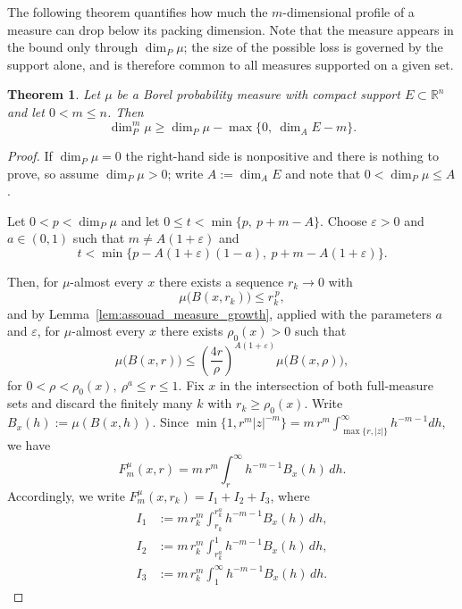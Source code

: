 \documentclass[12pt]{amsart}
\newtheorem{theorem}{Theorem}[section]
\theoremstyle{definition}
\theoremstyle{remark}
\numberwithin{equation}{section}
\begin{document}
The following theorem quantifies how much the $m$-dimensional profile of
a measure can drop below its packing dimension. Note that the
measure appears in the bound only through $\dim_P\mu$; the size of the
possible loss is governed by the support alone, and is therefore common
to all measures supported on a given set.

\begin{theorem}\label{thm:profile_assouad_bound}
    Let $\mu$ be a Borel probability measure with compact support
    $E\subset\mathbb{R}^{n}$ and let $0<m\leq n$. Then
    $$\dim_P^m \mu \geq \dim_P \mu - \max\{0,\ \dim_A E - m\}.$$
\end{theorem}


\begin{proof}
If $\dim_P\mu=0$ the right-hand side is nonpositive and there is nothing
to prove, so assume $\dim_P\mu>0$; write $A:=\dim_A E$ and note that
$0<\dim_P\mu\leq A$.

Let $0<p<\dim_P\mu$ and let $0\leq t<\min\{p,\ p+m-A\}$. Choose
$\varepsilon>0$ and $a\in(0,1)$ such that $m\neq A(1+\varepsilon)$ and
\begin{equation}\label{eq:choice_params}
t<\min\bigl\{p-A(1+\varepsilon)(1-a),\ p+m-A(1+\varepsilon)\bigr\}.
\end{equation}


Then, for $\mu$-almost every $x$ there
exists a sequence $r_k\to 0$ with
\begin{equation}\label{eq:frostman_seq}
\mu\bigl(B(x,r_k)\bigr)\leq r_k^{\,p},
\end{equation}
and by Lemma~\ref{lem:assouad_measure_growth}, applied with the
parameters $a$ and $\varepsilon$, for $\mu$-almost every $x$ there exists
$\rho_0(x)>0$ such that
\begin{equation}\label{eq:growth_thm}
\mu\bigl(B(x,r)\bigr)\leq\left(\frac{4r}{\rho}\right)^{A(1+\varepsilon)}
\mu\bigl(B(x,\rho)\bigr),
\end{equation}
for $0<\rho<\rho_0(x),\
\rho^{a}\leq r\leq 1.$
Fix $x$ in the intersection of both full-measure sets and discard the
finitely many $k$ with $r_k\geq\rho_0(x)$. Write $B_x(h):=\mu(B(x,h))$. Since
$\min\{1,r^m|z|^{-m}\}=m\,r^m\int_{\max\{r,|z|\}}^{\infty}h^{-m-1}dh$,
we have
$$F_{m}^{\mu}(x,r)=m\,r^{m}\int_{r}^{\infty}h^{-m-1}B_{x}(h)\,dh.$$
Accordingly, we write $F_{m}^{\mu}(x,r_k)=I_1+I_2+I_3$, where
\begin{align*}
I_1&:=m\,r_k^{m}\int_{r_k}^{r_k^{a}}h^{-m-1}B_{x}(h)\,dh,\\
I_2&:=m\,r_k^{m}\int_{r_k^{a}}^{1}h^{-m-1}B_{x}(h)\,dh,\\
I_3&:=m\,r_k^{m}\int_{1}^{\infty}h^{-m-1}B_{x}(h)\,dh.
\end{align*}


\end{proof}
\end{document}
